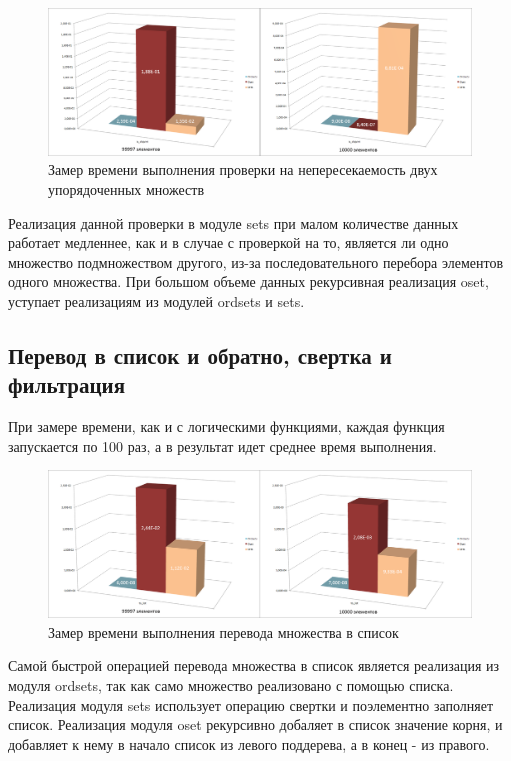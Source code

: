 		\begin{figure}[H]
				\centering
				\includegraphics[width=\textwidth]{img/histograms/is_disjoint.png}
				\caption{Замер времени выполнения проверки на непересекаемость двух упорядоченных множеств}
		\end{figure}
		Реализация данной проверки в модуле sets при малом количестве данных работает медленнее, как и в случае 
		с проверкой на то, является ли одно множество подмножеством другого, из-за последовательного перебора 
		элементов одного множества. При большом объеме данных рекурсивная реализация oset, уступает реализациям из 
		модулей ordsets и sets.
				
	
	\subsection{Перевод в список и обратно, свертка и фильтрация}
		При замере времени, как и с логическими функциями, каждая функция запускается по 100 раз, а в результат идет 
		среднее время выполнения.
		
		\begin{figure}[H]
				\centering
				\includegraphics[width=\textwidth]{img/histograms/to_list.png}
				\caption{Замер времени выполнения перевода множества в список}
		\end{figure}
		Самой быстрой операцией перевода множества в список является реализация из модуля ordsets, так как 
		само множество реализовано с помощью списка. Реализация модуля sets использует операцию свертки и 
		поэлементно заполняет список. Реализация модуля oset рекурсивно добаляет в список значение корня,
		и добавляет к нему в начало список из левого поддерева, а в конец - из правого.
		
